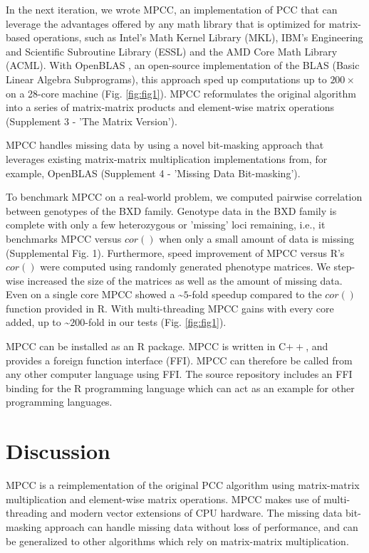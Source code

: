 \documentclass{bioinfo}
\begin{document}
In the next iteration, we wrote MPCC, an implementation of PCC that
can leverage the advantages offered by any math library that is
optimized for matrix-based operations, such as Intel’s Math Kernel
Library (MKL), IBM’s Engineering and Scientific Subroutine Library
(ESSL) and the AMD Core Math Library (ACML). With OpenBLAS \citep{Zhang:2011}, an 
open-source implementation of the BLAS (Basic Linear Algebra 
Subprograms), this approach sped up computations up to $200\times$ 
on a 28-core machine (Fig. \ref{fig:fig1}). MPCC reformulates the 
original algorithm into a series of matrix-matrix products and 
element-wise matrix operations (Supplement 3 - 'The Matrix Version').

MPCC handles missing data by using a novel bit-masking approach that
leverages existing matrix-matrix multiplication implementations from,
for example, OpenBLAS  (Supplement 4 - 'Missing Data Bit-masking').

To benchmark MPCC on a real-world problem, we computed pairwise 
correlation between genotypes of the BXD family. Genotype data in the BXD
family is complete with only a few heterozygous or 'missing' loci
remaining, i.e., it benchmarks MPCC versus $cor()$ when only a small amount
of data is missing (Supplemental Fig. 1). Furthermore, speed improvement of MPCC
versus R's $cor()$ were computed using randomly generated phenotype matrices.
We step-wise increased the size of the matrices as well as the amount of
missing data. Even on a single core MPCC showed a \textasciitilde{}$5$-fold
speedup compared to the $cor()$ function provided in R. With multi-threading
MPCC gains with every core added, up to \textasciitilde{}$200$-fold in our
tests (Fig. \ref{fig:fig1}).

MPCC can be installed as an R package. MPCC is written in C$++$, and
provides a foreign function interface (FFI). MPCC can therefore be
called from any other computer language using FFI. The source
repository includes an FFI binding for the R programming language
which can act as an example for other programming languages.

\section{Discussion}

MPCC is a reimplementation of the original PCC algorithm using matrix-matrix
multiplication and element-wise matrix operations. MPCC makes use of
multi-threading and modern vector extensions of CPU hardware. The missing
data bit-masking approach can handle missing data without loss of performance,
and can be generalized to other algorithms which rely on matrix-matrix multiplication.
\end{document}
